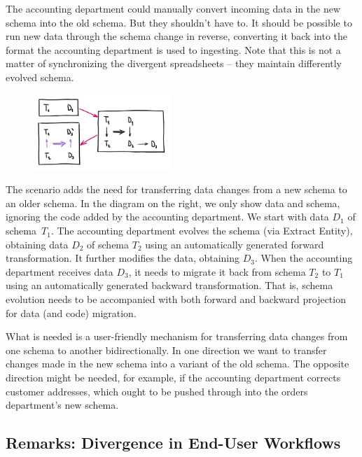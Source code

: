 \documentclass[english,submission]{programming}
\DeclareRobustCommand{\frameworkbox}[1]{\leftbar#1\endleftbar}
\newcommand{\frameworkboxtitle}[1]{\noindent{\firamedium #1.}\quad}
\begin{document}
The accounting department could manually convert incoming data in the new schema into the old schema. But they
shouldn't have to. It should be possible to run new data through the schema change in reverse,
converting it back into the format the accounting department is used to ingesting. Note that
this is not a matter of synchronizing the divergent spreadsheets -- they maintain differently
evolved schema.

\frameworkbox{
\begin{figure}
\vspace{-1.5em}
\includegraphics[width=14em]{figures/arr-backport.png}
\vspace{-2.5em}
\end{figure}
\frameworkboxtitle{Bidirectional Data Migration}
The scenario adds the need for transferring data changes from a new schema to an older schema.
In the diagram on the right, we only show data and schema, ignoring the code added by the
accounting department. We start with data $D_1$ of schema~$T_1$. The accounting department
evolves the schema (via Extract Entity), obtaining data $D_2$ of schema $T_2$ using an automatically
generated forward transformation. It further modifies the data, obtaining $D_3$. When the
accounting department receives data $D_3$, it needs to migrate it back from schema $T_2$ to
$T_1$ using an automatically generated backward transformation. That is,
schema evolution needs to be accompanied with both forward and backward projection for data
(and code) migration.}

What is needed is a user-friendly mechanism for transferring data changes from one schema to
another bidirectionally. In one direction we want to transfer changes made in the new schema
into a variant of the old schema. The opposite direction might be needed, for example,
if the accounting department corrects customer addresses, which ought to be pushed
through into the orders department's new schema.

\subsection*{Remarks: Divergence in End-User Workflows}
\end{document}

